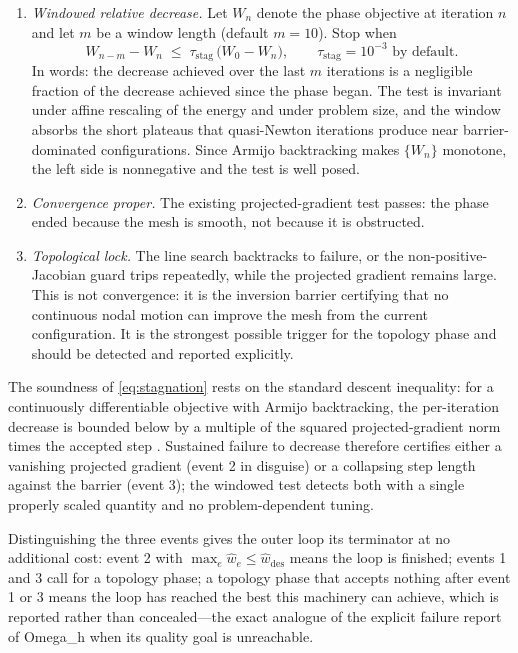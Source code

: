 \documentclass[11pt]{article}
\newcommand{\omegah}{Omega\_h}
\begin{document}
\begin{enumerate}[itemsep=2pt]
\item \emph{Windowed relative decrease.} Let $W_n$ denote the phase
  objective at iteration $n$ and let $m$ be a window length (default
  $m = 10$). Stop when
  \begin{equation}
  W_{n-m} - W_n \;\leq\; \tau_{\text{stag}}\,
  \bigl(W_0 - W_n\bigr),
  \qquad \tau_{\text{stag}} = 10^{-3} \text{ by default.}
  \label{eq:stagnation}
  \end{equation}
  In words: the decrease achieved over the last $m$ iterations is a
  negligible fraction of the decrease achieved since the phase began.
  The test is invariant under affine rescaling of the energy and under
  problem size, and the window absorbs the short plateaus that
  quasi-Newton iterations produce near barrier-dominated
  configurations. Since Armijo backtracking makes $\{W_n\}$
  monotone, the left side is nonnegative and the test is well posed.
\item \emph{Convergence proper.} The existing projected-gradient test
  passes: the phase ended because the mesh is smooth, not because it is
  obstructed.
\item \emph{Topological lock.} The line search backtracks to failure,
  or the non-positive-Jacobian guard trips repeatedly, while the
  projected gradient remains large. This is not convergence: it is the
  inversion barrier certifying that no continuous nodal motion can
  improve the mesh from the current configuration. It is the strongest
  possible trigger for the topology phase and should be detected and
  reported explicitly.
\end{enumerate}

The soundness of \eqref{eq:stagnation} rests on the standard descent
inequality: for a continuously differentiable objective with Armijo
backtracking, the per-iteration decrease is bounded below by a multiple
of the squared projected-gradient norm times the accepted step
\cite{nocedal2006}. Sustained failure to decrease therefore certifies
either a vanishing projected gradient (event 2 in disguise) or a
collapsing step length against the barrier (event 3); the windowed test
detects both with a single properly scaled quantity and no
problem-dependent tuning.

Distinguishing the three events gives the outer loop its terminator at
no additional cost: event 2 with $\max_e \hat{w}_e \leq
\hat{w}_{\text{des}}$ means the loop is finished; events 1 and 3 call
for a topology phase; a topology phase that accepts nothing after
event 1 or 3 means the loop has reached the best this machinery can
achieve, which is reported rather than concealed---the exact analogue of
the explicit failure report of \omegah{} when its quality goal is
unreachable.
\end{document}
